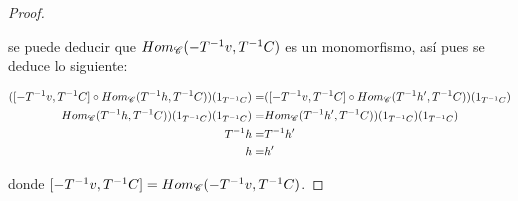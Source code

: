 \documentclass{article}
\begin{document}
\begin{enumerate}[label=\textbf{Ej \arabic*.}]
\begin{proof}
			\begin{center}
			\end{center}
			se puede deducir que $Hom_{\mathscr{C}}(-T^{-1}v,T^{-1}C)$ es un monomorfismo, as\'i pues se deduce lo siguiente:
			
			\begin{small}
				\begin{align*}
					([-T^{-1}v,T^{-1}C] \circ Hom_{\mathscr{C}}(T^{-1}h,T^{-1}C))(1_{T^{-1}C}) =& ([-T^{-1}v,T^{-1}C] \circ Hom_{\mathscr{C}}(T^{-1}h',T^{-1}C))(1_{T^{-1}C})\\
					Hom_{\mathscr{C}}(T^{-1}h,T^{-1}C))(1_{T^{-1}C})(1_{T^{-1}C}) =& Hom_{\mathscr{C}}(T^{-1}h',T^{-1}C))(1_{T^{-1}C})(1_{T^{-1}C}) \\
					T^{-1}h =& T^{-1}h'\\
					h =& h'
				\end{align*}
			\end{small}
			donde $[-T^{-1}v,T^{-1}C]=Hom_{\mathscr{C}}(-T^{-1}v,T^{-1}C)$. 
			

\end{proof}
\end{enumerate}
\end{document}
